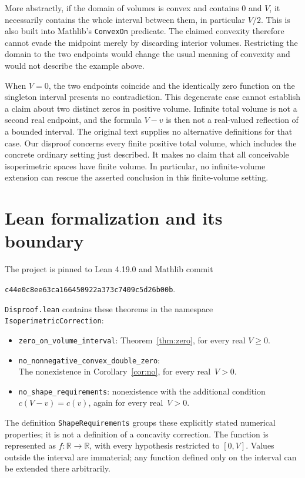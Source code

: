 \documentclass[11pt]{article}
\begin{document}
More abstractly, if the domain of volumes is convex and contains $0$ and $V$,
it necessarily contains the whole interval between them, in particular $V/2$.
This is also built into Mathlib's \texttt{ConvexOn} predicate. The claimed
convexity therefore cannot evade the midpoint merely by discarding interior
volumes. Restricting the domain to the two endpoints would change the usual
meaning of convexity and would not describe the example above.

When $V=0$, the two endpoints coincide and the identically zero function on
the singleton interval presents no contradiction. This degenerate case cannot
establish a claim about two distinct zeros in positive volume. Infinite total
volume is not a second real endpoint, and the formula $V-v$ is then not a
real-valued reflection of a bounded interval. The original text supplies no
alternative definitions for that case. Our disproof concerns every finite
positive total volume, which includes the concrete ordinary setting just
described. It makes no claim that all conceivable isoperimetric spaces have
finite volume. In particular, no infinite-volume extension can rescue the
asserted conclusion in this finite-volume setting.

\clearpage
\section{Lean formalization and its boundary}
The project is pinned to Lean 4.19.0 and Mathlib commit
\begin{center}
\small\texttt{c44e0c8ee63ca166450922a373c7409c5d26b00b}.
\end{center}
\texttt{Disproof.lean} contains these theorems in the namespace
\texttt{IsoperimetricCorrection}:
\begin{itemize}
\item \texttt{zero\_on\_volume\_interval}: Theorem~\ref{thm:zero}, for every
real $V\geq0$.
\item \texttt{no\_nonnegative\_convex\_double\_zero}:\\
The nonexistence in
Corollary~\ref{cor:no}, for every real~\mbox{$V>0$}.
\item \texttt{no\_shape\_requirements}: nonexistence with the additional
condition $c(V-v)=c(v)$, again for every real~\mbox{$V>0$}.
\end{itemize}
The definition \texttt{ShapeRequirements} groups these explicitly stated
numerical properties; it is not a definition of a concavity correction.
The function is represented as $f:\mathbb R\to\mathbb R$, with every
hypothesis restricted to $[0,V]$. Values outside the interval are immaterial;
any function defined only on the interval can be extended there arbitrarily.
\end{document}
